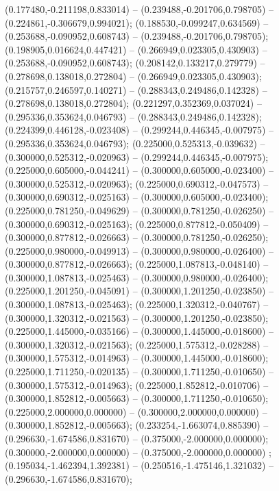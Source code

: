  (0.177480,-0.211198,0.833014) -- (0.239488,-0.201706,0.798705) -- (0.224861,-0.306679,0.994021);
 (0.188530,-0.099247,0.634569) -- (0.253688,-0.090952,0.608743) -- (0.239488,-0.201706,0.798705);
 (0.198905,0.016624,0.447421) -- (0.266949,0.023305,0.430903) -- (0.253688,-0.090952,0.608743);
 (0.208142,0.133217,0.279779) -- (0.278698,0.138018,0.272804) -- (0.266949,0.023305,0.430903);
 (0.215757,0.246597,0.140271) -- (0.288343,0.249486,0.142328) -- (0.278698,0.138018,0.272804);
 (0.221297,0.352369,0.037024) -- (0.295336,0.353624,0.046793) -- (0.288343,0.249486,0.142328);
 (0.224399,0.446128,-0.023408) -- (0.299244,0.446345,-0.007975) -- (0.295336,0.353624,0.046793);
 (0.225000,0.525313,-0.039632) -- (0.300000,0.525312,-0.020963) -- (0.299244,0.446345,-0.007975);
 (0.225000,0.605000,-0.044241) -- (0.300000,0.605000,-0.023400) -- (0.300000,0.525312,-0.020963);
 (0.225000,0.690312,-0.047573) -- (0.300000,0.690312,-0.025163) -- (0.300000,0.605000,-0.023400);
 (0.225000,0.781250,-0.049629) -- (0.300000,0.781250,-0.026250) -- (0.300000,0.690312,-0.025163);
 (0.225000,0.877812,-0.050409) -- (0.300000,0.877812,-0.026663) -- (0.300000,0.781250,-0.026250);
 (0.225000,0.980000,-0.049913) -- (0.300000,0.980000,-0.026400) -- (0.300000,0.877812,-0.026663);
 (0.225000,1.087813,-0.048140) -- (0.300000,1.087813,-0.025463) -- (0.300000,0.980000,-0.026400);
 (0.225000,1.201250,-0.045091) -- (0.300000,1.201250,-0.023850) -- (0.300000,1.087813,-0.025463);
 (0.225000,1.320312,-0.040767) -- (0.300000,1.320312,-0.021563) -- (0.300000,1.201250,-0.023850);
 (0.225000,1.445000,-0.035166) -- (0.300000,1.445000,-0.018600) -- (0.300000,1.320312,-0.021563);
 (0.225000,1.575312,-0.028288) -- (0.300000,1.575312,-0.014963) -- (0.300000,1.445000,-0.018600);
 (0.225000,1.711250,-0.020135) -- (0.300000,1.711250,-0.010650) -- (0.300000,1.575312,-0.014963);
 (0.225000,1.852812,-0.010706) -- (0.300000,1.852812,-0.005663) -- (0.300000,1.711250,-0.010650);
 (0.225000,2.000000,0.000000) -- (0.300000,2.000000,0.000000) -- (0.300000,1.852812,-0.005663);
 (0.233254,-1.663074,0.885390) -- (0.296630,-1.674586,0.831670) -- (0.375000,-2.000000,0.000000);
 (0.300000,-2.000000,0.000000) -- (0.375000,-2.000000,0.000000) ;
 (0.195034,-1.462394,1.392381) -- (0.250516,-1.475146,1.321032) -- (0.296630,-1.674586,0.831670);
